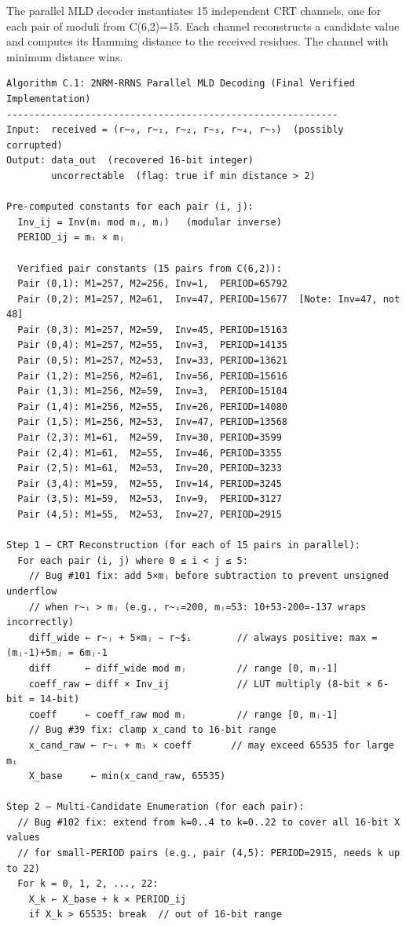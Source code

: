 \documentclass[
  12pt,
  a4paper]{report}
\begin{document}
The parallel MLD decoder instantiates 15 independent CRT channels, one
for each pair of moduli from C(6,2)=15. Each channel reconstructs a
candidate value and computes its Hamming distance to the received
residues. The channel with minimum distance wins.

\begin{verbatim}
Algorithm C.1: 2NRM-RRNS Parallel MLD Decoding (Final Verified Implementation)
-----------------------------------------------------------
Input:  received = (r~₀, r~₁, r~₂, r~₃, r~₄, r~₅)  (possibly corrupted)
Output: data_out  (recovered 16-bit integer)
        uncorrectable  (flag: true if min distance > 2)

Pre-computed constants for each pair (i, j):
  Inv_ij = Inv(mᵢ mod mⱼ, mⱼ)   (modular inverse)
  PERIOD_ij = mᵢ × mⱼ

  Verified pair constants (15 pairs from C(6,2)):
  Pair (0,1): M1=257, M2=256, Inv=1,  PERIOD=65792
  Pair (0,2): M1=257, M2=61,  Inv=47, PERIOD=15677  [Note: Inv=47, not 48]
  Pair (0,3): M1=257, M2=59,  Inv=45, PERIOD=15163
  Pair (0,4): M1=257, M2=55,  Inv=3,  PERIOD=14135
  Pair (0,5): M1=257, M2=53,  Inv=33, PERIOD=13621
  Pair (1,2): M1=256, M2=61,  Inv=56, PERIOD=15616
  Pair (1,3): M1=256, M2=59,  Inv=3,  PERIOD=15104
  Pair (1,4): M1=256, M2=55,  Inv=26, PERIOD=14080
  Pair (1,5): M1=256, M2=53,  Inv=47, PERIOD=13568
  Pair (2,3): M1=61,  M2=59,  Inv=30, PERIOD=3599
  Pair (2,4): M1=61,  M2=55,  Inv=46, PERIOD=3355
  Pair (2,5): M1=61,  M2=53,  Inv=20, PERIOD=3233
  Pair (3,4): M1=59,  M2=55,  Inv=14, PERIOD=3245
  Pair (3,5): M1=59,  M2=53,  Inv=9,  PERIOD=3127
  Pair (4,5): M1=55,  M2=53,  Inv=27, PERIOD=2915

Step 1 — CRT Reconstruction (for each of 15 pairs in parallel):
  For each pair (i, j) where 0 ≤ i < j ≤ 5:
    // Bug #101 fix: add 5×mⱼ before subtraction to prevent unsigned underflow
    // when r~ᵢ > mⱼ (e.g., r~ᵢ=200, mⱼ=53: 10+53-200=-137 wraps incorrectly)
    diff_wide ← r~ⱼ + 5×mⱼ − r~$ᵢ        // always positive: max = (mⱼ-1)+5mⱼ = 6mⱼ-1
    diff      ← diff_wide mod mⱼ         // range [0, mⱼ-1]
    coeff_raw ← diff × Inv_ij            // LUT multiply (8-bit × 6-bit = 14-bit)
    coeff     ← coeff_raw mod mⱼ         // range [0, mⱼ-1]
    // Bug #39 fix: clamp x_cand to 16-bit range
    x_cand_raw ← r~ᵢ + mᵢ × coeff       // may exceed 65535 for large mᵢ
    X_base     ← min(x_cand_raw, 65535)

Step 2 — Multi-Candidate Enumeration (for each pair):
  // Bug #102 fix: extend from k=0..4 to k=0..22 to cover all 16-bit X values
  // for small-PERIOD pairs (e.g., pair (4,5): PERIOD=2915, needs k up to 22)
  For k = 0, 1, 2, ..., 22:
    X_k ← X_base + k × PERIOD_ij
    if X_k > 65535: break  // out of 16-bit range


\end{verbatim}
\end{document}
